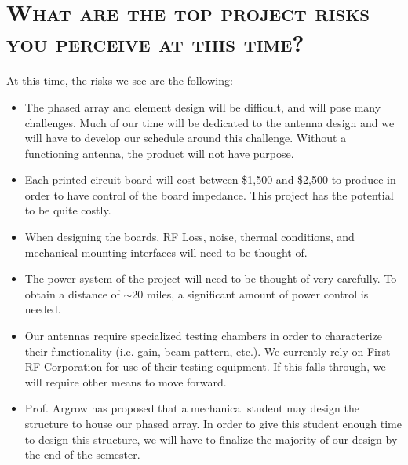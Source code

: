 \documentclass[11pt]{article}
\numberwithin{figure}{section}
\begin{document}
\section{\textsc{What are the top project risks you perceive at this time?}}
	At this time, the risks we see are the following:
	\begin{itemize}
		\item The phased array and element design will be difficult, and will pose many challenges.  Much of our time will be dedicated to the antenna design and we will have to develop our schedule around this challenge.  Without a functioning antenna, the product will not have purpose.
		\item Each printed circuit board will cost between \$1,500 and \$2,500 to produce in order to have control of the board impedance.  This project has the potential to be quite costly.
		\item When designing the boards, RF Loss, noise, thermal conditions, and mechanical mounting interfaces will need to be thought of.
		\item The power system of the project will need to be thought of very carefully.  To obtain a distance of $\sim$20 miles, a significant amount of power control is needed.
		\item Our antennas require specialized testing chambers in order to characterize their functionality (i.e.  gain, beam pattern, etc.).  We currently rely on First RF Corporation for use of their testing equipment.  If this falls through, we will require other means to move forward.
		\item Prof.  Argrow has proposed that a mechanical student may design the structure to house our phased array.  In order to give this student enough time to design this structure, we will have to finalize the majority of our design by the end of the semester.  
	\end{itemize}
\end{document}
